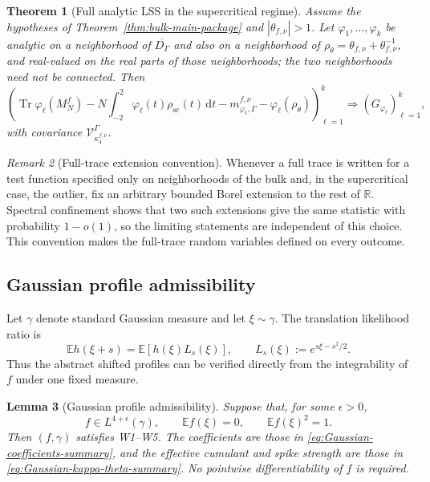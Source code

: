 \documentclass[11pt]{article}
\newtheorem{theorem}{Theorem}[section]
\newtheorem{lemma}[theorem]{Lemma}
\theoremstyle{definition}
\theoremstyle{remark}
\newtheorem{remark}[theorem]{Remark}
\newcommand{\E}{\mathbb E}
\newcommand{\Tr}{\operatorname{Tr}}
\newcommand{\scal}{\mathrm{sc}}
\newcommand{\dd}{\mathrm d}
\begin{document}
\begin{theorem}[Full analytic LSS in the supercritical regime]
\label{thm:R6-supercritical-full}
Assume the hypotheses of Theorem~\ref{thm:bulk-main-package} and
$|\theta_{f,\nu}|>1$.  Let $\varphi_1,\ldots,\varphi_k$ be analytic on a
neighborhood of $\overline{D_\Gamma}$ and also on a neighborhood of
$\rho_\theta=\theta_{f,\nu}+\theta_{f,\nu}^{-1}$, and real-valued on the real
parts of those neighborhoods; the two neighborhoods need not be connected.
Then
\begin{equation}\label{eq:R6-full-CLT}
 \left(
 \Tr\varphi_\ell(M_N^f)
 -N\int_{-2}^2\varphi_\ell(t)\rho_{\scal}(t)\,\dd t
 -m_{\varphi_\ell,\Gamma}^{f,\nu}
 -\varphi_\ell(\rho_\theta)
 \right)_{\ell=1}^k
 \Longrightarrow (G_{\varphi_\ell})_{\ell=1}^k,
\end{equation}
with covariance $\mathcal V_{\kappa_4^{f,\nu}}^\Gamma$.
\end{theorem}

\begin{remark}[Full-trace extension convention]
Whenever a full trace is written for a test function specified only on
neighborhoods of the bulk and, in the supercritical case, the outlier, fix an
arbitrary bounded Borel extension to the rest of \(\mathbb R\).  Spectral
confinement shows that two such extensions give the same statistic with
probability \(1-o(1)\), so the limiting statements are independent of this
choice.  This convention makes the full-trace random variables defined on
every outcome.
\end{remark}

\subsection{Gaussian profile admissibility}
\label{subsec:gaussian-profile-main}

Let $\gamma$ denote standard Gaussian measure and let $\xi\sim\gamma$.  The
translation likelihood ratio is
\begin{equation}\label{eq:Gaussian-LR-main}
 \E h(\xi+s)
 =\E\!\left[h(\xi)L_s(\xi)\right],
 \qquad
 L_s(\xi):=e^{s\xi-s^2/2}.
\end{equation}
Thus the abstract shifted profiles can be verified directly from the
integrability of $f$ under one fixed measure.

\begin{lemma}[Gaussian profile admissibility]
\label{lem:gaussian-profile-main}
Suppose that, for some $\epsilon>0$,
\begin{equation}\label{eq:Gaussian-f-assumptions-main}
 f\in L^{4+\epsilon}(\gamma),
 \qquad
 \E f(\xi)=0,
 \qquad
 \E f(\xi)^2=1.
\end{equation}
Then $(f,\gamma)$ satisfies W1--W5.  The coefficients are those in
\eqref{eq:Gaussian-coefficients-summary}, and the effective cumulant and spike
strength are those in \eqref{eq:Gaussian-kappa-theta-summary}.  No pointwise
differentiability of $f$ is required.
\end{lemma}
\end{document}
